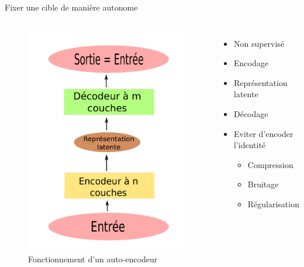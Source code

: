 \documentclass{beamer}
\begin{document}
\begin{frame}{Fixer une cible  de manière autonome}

  \begin{columns}
    \begin{figure}
      \centering
      \includegraphics[scale=0.10]{../Figures/Autoencoder}
      \caption{Fonctionnement d'un auto-encodeur}
    \end{figure}

    \begin{itemize}
    \item Non supervisé\pause
    \item Encodage\pause
    \item Représentation latente \pause
    \item Décodage \pause
    \item Eviter d'encoder l'identité\pause
      \begin{itemize}
      \item Compression\pause
      \item Bruitage\pause
      \item Régularisation
      \end{itemize}
    \end{itemize}
  \end{columns}
\end{frame}
\end{document}
